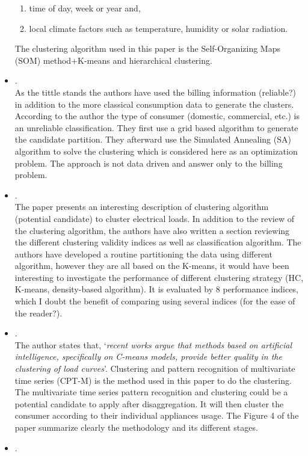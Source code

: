 \begin{itemize}
\begin{enumerate}
		\item time of day, week or year and,
		\item local climate factors such as temperature, humidity or solar radiation.
	 \end{enumerate}
	 The clustering algorithm used in this paper is the Self-Organizing Maps (SOM) method+K-means and hierarchical clustering.
	\item {}.\\
	 As the tittle stands the authors have used the billing information (reliable?) in addition to the more classical consumption data to generate the clusters. According to the author the type of consumer (domestic, commercial, etc.) is an unreliable classification. They first use a grid based algorithm to generate the candidate partition. They afterward use the Simulated Annealing (SA) algorithm to solve the clustering which is considered here as an optimization problem. The approach is not data driven and answer only to the billing problem.
	\item {}.\\
	 The paper presents  an interesting description of clustering algorithm (potential candidate) to cluster electrical loads. In addition to the review of the clustering algorithm, the authors have also written a section reviewing the different clustering validity indices as well as classification algorithm. The authors have developed a routine partitioning the data using different algorithm, however they are all based on the K-means, it would have been interesting to investigate the performance of different clustering strategy (HC, K-means, density-based algorithm). It is evaluated by 8 performance indices, which I doubt the benefit of comparing using several indices (for the ease of the reader?).
	\item {}.\\
	 The author states that, `\emph{recent works argue that methods based on artificial intelligence, specifically on C-means models, provide better quality in the clustering of load curves}'. Clustering and pattern recognition of multivariate time series (CPT-M) is the method used in this paper to do the clustering. The multivariate time series pattern recognition and clustering could be a potential candidate to apply after disaggregation. It will then cluster the consumer according to their individual appliances usage. The Figure 4 of the paper summarize clearly the methodology and its different stages.
	\item {}.\\

\end{itemize}
